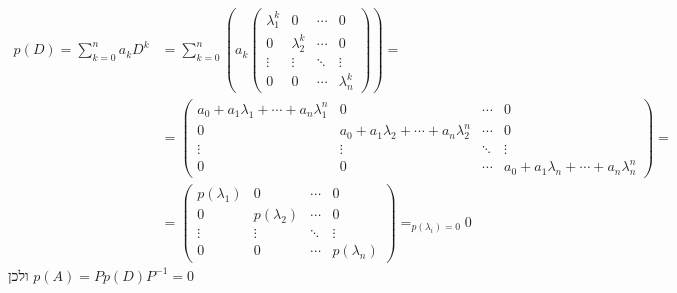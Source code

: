 \documentclass{article}
\DeclareMathOperator*{\equals}{=}
\begin{document}
\begin{align*}
    p(D)=\sum_{k=0}^n  a_k D^k & =\sum_{k=0}^n\left( a_k \begin{pmatrix}
            \lambda_1^k & 0           & \cdots & 0           \\
            0           & \lambda_2^k & \cdots & 0           \\
            \vdots      & \vdots      & \ddots & \vdots      \\
            0           & 0           & \cdots & \lambda_n^k
        \end{pmatrix} \right)= \\
                               & =\begin{pmatrix}
        a_0+a_1\lambda_1+\cdots+a_n\lambda_1^n & 0                                      & \cdots & 0                                      \\
        0                                      & a_0+a_1\lambda_2+\cdots+a_n\lambda_2^n & \cdots & 0                                      \\
        \vdots                                 & \vdots                                 & \ddots & \vdots                                 \\
        0                                      & 0                                      & \cdots & a_0+a_1\lambda_n+\cdots+a_n\lambda_n^n
    \end{pmatrix}=                                \\
                               & = \begin{pmatrix}
        p(\lambda_1) & 0            & \cdots & 0            \\
        0            & p(\lambda_2) & \cdots & 0            \\
        \vdots       & \vdots       & \ddots & \vdots       \\
        0            & 0            & \cdots & p(\lambda_n)
    \end{pmatrix}\equals_{p(\lambda_i)=0}
    0
\end{align*}
ולכן $p(A)=Pp(D)P^{-1}=0$
\end{document}

